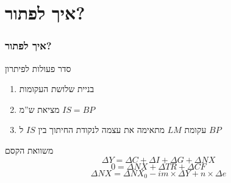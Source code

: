 \documentclass[10pt,usenames,dvipsnames]{beamer}
\newcommand{\D}[1]{\Delta #1}
\newcommand{\heart}{\ensuremath\heartsuit}
\begin{document}
\begin{RTL}
\begin{frame}
\begin{center}
    \end{center}

    

\end{frame}

\section{איך לפתור?}
\begin{frame}
    \frametitle{איך לפתור?}
    \begin{exampleblock}{סדר פעולות לפיתרון}
        \begin{enumerate}
            \item בניית שלושת העקומות
            \item מציאת ש''מ $IS = BP$
            \item עקומת $LM$ מתאימה את עצמה לנקודת החיתוך בין $IS$ ל $BP$
        \end{enumerate}
    \end{exampleblock}

    \begin{block}{משוואת הקסם}
        $$\D Y = \D C + \D I  + \D G + \D NX$$
        $$0 = \D NX + \D TR + \D CF$$
        $$\D NX = \D NX_0 - im \times \D Y + n \times \D e$$
    \end{block}
    

\end{frame}
\end{RTL}
\end{document}
